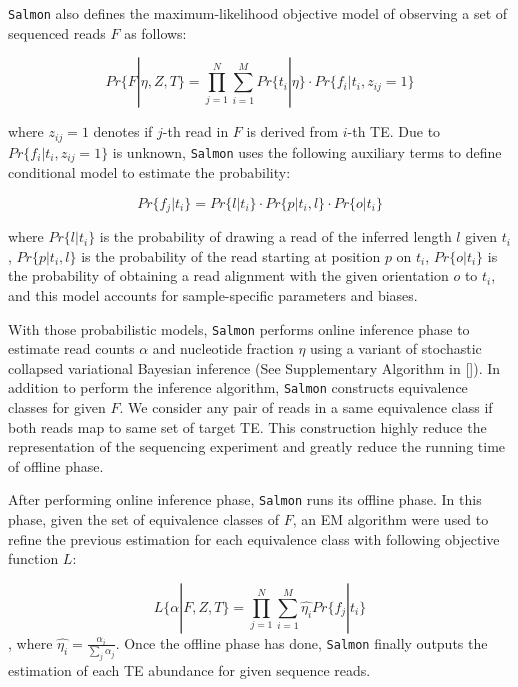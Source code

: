 \documentclass[wsdraft]{ws-procs11x85}
\begin{document}
\texttt{Salmon} also defines the maximum-likelihood objective model of observing a set of sequenced reads $F$ as follows:

\begin{equation} \label{eq:3}
Pr\{F|\eta,Z, T \}=
\prod_{j=1}^{N}\sum_{i=1}^{M} Pr\{ t_i | \eta \}  \cdot
 Pr \{ f_i | t_i, z_{ij}=1 \}
\end{equation}

where $z_{ij} = 1$ denotes if $j$-th read in $F$ is derived from $i$-th TE. Due to $Pr \{f_i| t_i, z_{ij}=1\}$ is unknown, \texttt{Salmon} uses the following auxiliary terms to define conditional model to estimate the probability:

\begin{equation}
Pr \{f_j | t_i \} = Pr \{ l | t_i \} 
\cdot Pr \{ p | t_i, l \} 
\cdot Pr \{ o | t_i \} 
\end{equation}

where $Pr \{ l | t_i \}$  is the probability of drawing a read of the inferred length $l$ given $t_i$,  
$Pr \{ p | t_i, l \}$ is the probability of the read starting at position $p$ on $t_i$,
$Pr \{ o | t_i \}$ is the probability of obtaining a read alignment with the given orientation $o$ to $t_i$, and this model accounts for sample-specific parameters and biases. 

With those probabilistic models, \texttt{Salmon} performs online inference phase to estimate read counts $\alpha$ and nucleotide fraction $\eta$ using a variant of stochastic collapsed variational Bayesian inference (See Supplementary Algorithm in []).\cite{foulds2013stochastic} In addition to perform the inference algorithm, \texttt{Salmon} constructs equivalence classes for given $F$. We consider any pair of reads in a same equivalence class if both reads map to same set of target TE. This construction highly reduce the representation of the sequencing experiment and greatly reduce the running time of offline phase.\cite{patro2017salmon}

After performing online inference phase, \texttt{Salmon} runs its offline phase. In this phase, given the set of equivalence classes of $F$, an EM algorithm were used to refine the previous estimation for each equivalence class with following objective function $L$:

\begin{equation}
L\{\alpha| F, Z, T\} = \prod_{j=1}^{N} \sum_{i=1}^{M} \hat{\eta_i} Pr \{f_j|t_i\}
\end{equation},
where $\hat{\eta_i}=\frac{\alpha_i}{\sum_{j}\alpha_j}$. Once the offline phase has done, \texttt{Salmon} finally outputs the estimation of each TE abundance for given sequence reads.
\end{document}
